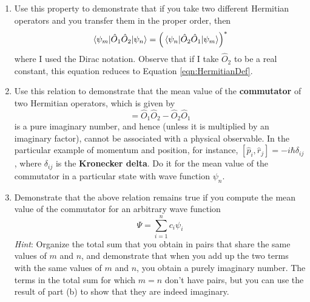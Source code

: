\documentclass[../psets.tex]{subfiles}
\begin{document}
\begin{enumerate}
    \begin{enumerate}
        \item Use this property to demonstrate that if you take two different Hermitian operators
        and you transfer them in the proper order, then
        \begin{equation*}
            \mel{\psi_m}{\hat{O}_1\hat{O}_2}{\psi_n} = \left( \mel{\psi_n}{\hat{O}_2\hat{O}_1}{\psi_m} \right)^*
        \end{equation*}
        where I used the Dirac notation. Observe that if I take $\hat{O}_2$ to be a real constant, this equation reduces to Equation \ref{eqn:HermitianDef}.
        \item Use this relation to demonstrate that the mean value of the \textbf{commutator} of two Hermitian operators, which is given by
        \begin{equation*}
            [\hat{O}_1,\hat{O}_2] = \hat{O}_1\hat{O}_2-\hat{O}_2\hat{O}_1
        \end{equation*}
        is a pure imaginary number, and hence (unless it is multiplied by an imaginary factor), cannot be associated with a physical observable. In the particular example of momentum and position, for instance, $[\hat{p}_i,\hat{r}_j]=-i\hbar\delta_{ij}$, where $\delta_{ij}$ is the \textbf{Kronecker delta}. Do it for the mean value of the commutator in a particular state with wave function $\psi_n$.
        \item Demonstrate that the above relation remains true if you compute the mean value of the commutator for an arbitrary wave function
        \begin{equation*}
            \Psi = \sum_{i=1}^nc_i\psi_i
        \end{equation*}
        \emph{Hint}: Organize the total sum that you obtain in pairs that share the same values of $m$ and $n$, and demonstrate that when you add up the two terms with the same values of $m$ and $n$, you obtain a purely imaginary number. The terms in the total sum for which $m=n$ don't have pairs, but you can use the result of part (b) to show that they are indeed imaginary.
    \end{enumerate}
\end{enumerate}
\end{document}
